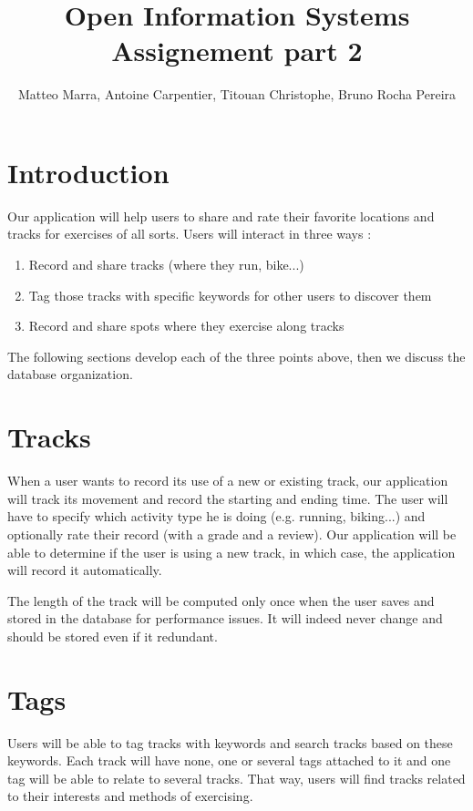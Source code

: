 \documentclass[a4paper]{article}
\title{Open Information Systems\\Assignement part 2 }
\author{Matteo Marra, Antoine Carpentier, Titouan Christophe, Bruno Rocha Pereira}
\begin{document}
\maketitle


\section{Introduction}

Our application will help users to share and rate their favorite locations and tracks for exercises of all sorts. Users will interact in three ways : 

\begin{enumerate}
    \item Record and share tracks (where they run, bike...)
    \item Tag those tracks with specific keywords for other users to discover them
    \item Record and share spots where they exercise along tracks
\end{enumerate}

The following sections develop each of the three points above, then we discuss
the database organization.

\section{Tracks}

When a user wants to record its use of a new or existing track, our application will track its movement and record the starting and ending time. The user will have to specify which activity type he is doing (e.g. running, biking...) and optionally rate their record (with a grade and a review). Our application will be able to determine if the user is using a new track, in which case, the application will record it automatically.

The length of the track will be computed only once when the user saves and stored in the database for performance issues. It will indeed never change and should be stored even if it redundant.

\section{Tags}

Users will be able to tag tracks with keywords and search tracks based on these keywords. Each track will have none, one or several tags attached to it and one tag will be able to relate to several tracks. That way, users will find tracks related to their interests and methods of exercising.
\end{document}
